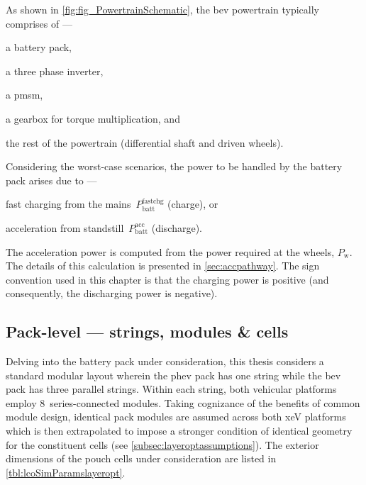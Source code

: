As  shown   in  \cref{fig:fig_PowertrainSchematic},  the   \gls{bev}  powertrain
typically comprises of ---
\begin{enumerate*}[label=\itshape\alph*\upshape)]
    \item a battery pack,
    \item a three phase inverter,
    \item a \gls{pmsm},
    \item a gearbox for  torque multiplication, and
    \item the rest of the  powertrain  (differential shaft  and driven  wheels).
\end{enumerate*}
Considering the  worst-case scenarios, the  power to  be handled by  the battery
pack arises due to  ---
\begin{enumerate*}[label=\roman*)]
    \item fast charging from  the mains~$P^\text{fastchg}_\text{batt}$ (charge), or
    \item acceleration  from standstill~$P^\text{acc}_\text{batt}$ (discharge).
\end{enumerate*}
The   acceleration  power   is  computed   from  the   power  required   at  the
wheels,  $P_\text{w}$.  The   details  of  this  calculation   is  presented  in
\cref{sec:accpathway}.  The  sign  convention  used  in  this  chapter  is  that
the  charging power  is positive  (and  consequently, the  discharging power  is
negative).

\subsection{Pack-level --- strings, modules \& cells}\label{sec:packlevelhierarchy}

Delving  into the  battery pack  under  consideration, this  thesis considers  a
standard  modular  layout wherein  the  \gls{phev}  pack  has one  string  while
the  \gls{bev}  pack  has  three  parallel strings.  Within  each  string,  both
vehicular  platforms employ  8~series-connected  modules.  Taking cognizance  of
the  benefits  of common  module  design,  identical  pack modules  are  assumed
across  both  \gls{xeV}  platforms  which  is  then  extrapolated  to  impose  a
stronger  condition  of  identical  geometry  for  the  constituent  cells  (see
\cref{subsec:layeroptassumptions}). The  exterior dimensions of the  pouch cells
under consideration are listed in \cref{tbl:lcoSimParamslayeropt}.

